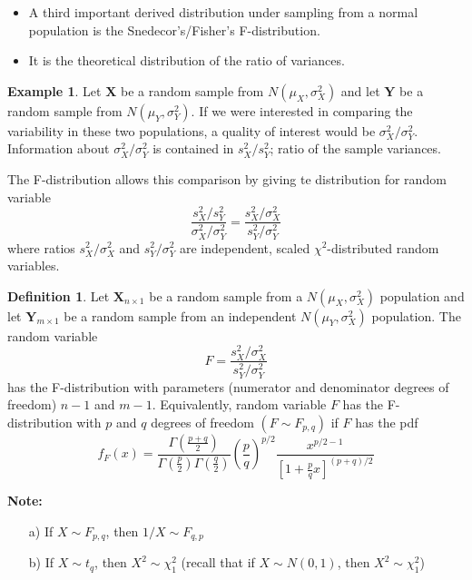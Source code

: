 \documentclass[10pt, twoside, a4paper]{book}
\theoremstyle{definition}
\newtheorem{example}{Example}[chapter]
\newtheorem{definition}{Definition}[chapter]
\begin{document}
\begin{itemize}
  \item A third important derived distribution under sampling from a
normal population is the Snedecor's/Fisher's F-distribution. 
\item It is the theoretical distribution of
the ratio of variances.
\end{itemize}
\begin{example}
Let $\bm X$ be a random sample from $N(\mu_X,\sigma_X^2)$ and let $\bm Y$ be a
random sample from $N(\mu_Y,\sigma_Y^2)$. If we were interested in comparing the
variability in these two populations, a quality of interest would be
$\sigma_X^2/\sigma_Y^2$. Information about $\sigma_X^2/\sigma_Y^2$ is contained
in $s_X^2/s_Y^2$; ratio of the sample variances.

The F-distribution allows this comparison by giving te distribution for random
variable
$$\frac{s_X^2/s_Y^2}{\sigma_X^2/\sigma_Y^2} =
\frac{s_X^2/\sigma_X^2}{s_Y^2/\sigma_Y^2} $$
where ratios $s_X^2/\sigma_X^2$ and $s_Y^2/\sigma_Y^2$ are independent, scaled
$\chi^2$-distributed random variables. 
\end{example}

\begin{definition}
Let $\bm X_{n \times 1}$ be a random sample from a $N(\mu_X, \sigma_X^2)$
population and let $\bm Y_{m \times 1}$ be a random sample from an independent
$N(\mu_Y, \sigma_X^2)$ population. The random variable
$$F = \frac{s_X^2/\sigma_X^2}{s_Y^2/\sigma_Y^2} $$
has the F-distribution with parameters (numerator and denominator degrees of
freedom) $n-1$ and $m-1$. Equivalently, random variable $F$ has the
F-distribution with $p$ and $q$ degrees of freedom $(F \sim F_{p,q})$ if $F$ has
the pdf
$$f_F(x) =
\frac{\Gamma(\frac{p+q}{2})}{\Gamma(\frac{p}{2})\Gamma(\frac{q}{2})}\left(\frac{p}{q}\right)^{p/2}\frac{x^{p/2-1}}{\left[1+\frac{p}{q}x\right]^{(p+q)/2}}$$
\end{definition}
\textbf{Note:} \begin{itemize}
  \item[a)] If $X \sim F_{p,q}$, then $1/X \sim F_{q,p}$
  \item[b)] If $X \sim t_q$, then $X^2 \sim \chi_1^2$ (recall that if $X \sim
  N(0,1)$, then $X^2 \sim \chi_1^2$)
\end{itemize}
\end{document}

